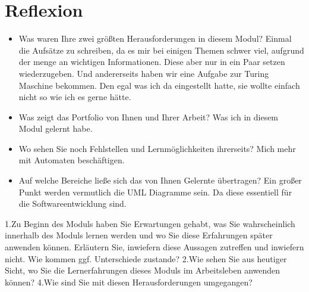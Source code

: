 \section{Reflexion}

\begin{itemize}
	\item Was waren Ihre zwei größten Herausforderungen in diesem Modul?
	\subitem Einmal die Aufsätze zu schreiben, da es mir bei einigen Themen schwer viel, aufgrund der menge an wichtigen Informationen. Diese aber nur in ein Paar setzen wiederzugeben.
	\subitem Und andererseits haben wir eine Aufgabe zur Turing Maschine bekommen. Den egal was ich da
	eingestellt hatte, sie wollte einfach nicht so wie ich es gerne hätte. 
	
	\item Was zeigt das Portfolio von Ihnen und Ihrer Arbeit?
	\subitem Was ich in diesem Modul gelernt habe.
	
	\item Wo sehen Sie noch Fehlstellen und Lernmöglichkeiten ihrerseits?
	\subitem Mich mehr mit Automaten beschäftigen.
	
	\item Auf welche Bereiche ließe sich das von Ihnen Gelernte übertragen?
	\subitem Ein großer Punkt werden vermutlich die UML Diagramme sein. Da diese essentiell für die Softwareentwicklung sind. 
\end{itemize}

1.Zu Beginn des Moduls haben Sie Erwartungen gehabt, was Sie wahrscheinlich innerhalb des Moduls lernen werden und wo Sie diese Erfahrungen später anwenden können. Erläutern Sie, inwiefern diese Aussagen zutreffen und inwiefern nicht. Wie kommen ggf. Unterschiede zustande?
2.Wie sehen Sie aus heutiger Sicht, wo Sie die Lernerfahrungen dieses Moduls im Arbeitsleben anwenden können?
4.Wie sind Sie mit diesen Herausforderungen umgegangen?
